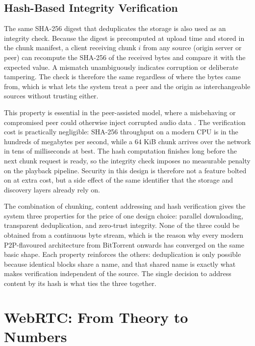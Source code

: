 \subsection{Hash-Based Integrity Verification}
\label{subsec:integrity}

\indent \par The same SHA-256 digest that deduplicates the storage is also used as an integrity check. Because the digest is precomputed at upload time and stored in the chunk manifest, a client receiving chunk $i$ from any source (origin server or peer) can recompute the SHA-256 of the received bytes and compare it with the expected value. A mismatch unambiguously indicates corruption or deliberate tampering. The check is therefore the same regardless of where the bytes came from, which is what lets the system treat a peer and the origin as interchangeable sources without trusting either.

\par This property is essential in the peer-assisted model, where a misbehaving or compromised peer could otherwise inject corrupted audio data \cite{webrtc_security}. The verification cost is practically negligible: SHA-256 throughput on a modern CPU is in the hundreds of megabytes per second, while a 64 KiB chunk arrives over the network in tens of milliseconds at best. The hash computation finishes long before the next chunk request is ready, so the integrity check imposes no measurable penalty on the playback pipeline. Security in this design is therefore not a feature bolted on at extra cost, but a side effect of the same identifier that the storage and discovery layers already rely on.

\indent \par The combination of chunking, content addressing and hash verification gives the system three properties for the price of one design choice: parallel downloading, transparent deduplication, and zero-trust integrity. None of the three could be obtained from a continuous byte stream, which is the reason why every modern P2P-flavoured architecture from BitTorrent onwards has converged on the same basic shape. Each property reinforces the others: deduplication is only possible because identical blocks share a name, and that shared name is exactly what makes verification independent of the source. The single decision to address content by its hash is what ties the three together.


\section{WebRTC: From Theory to Numbers}
\label{sec:webrtc-theory}

